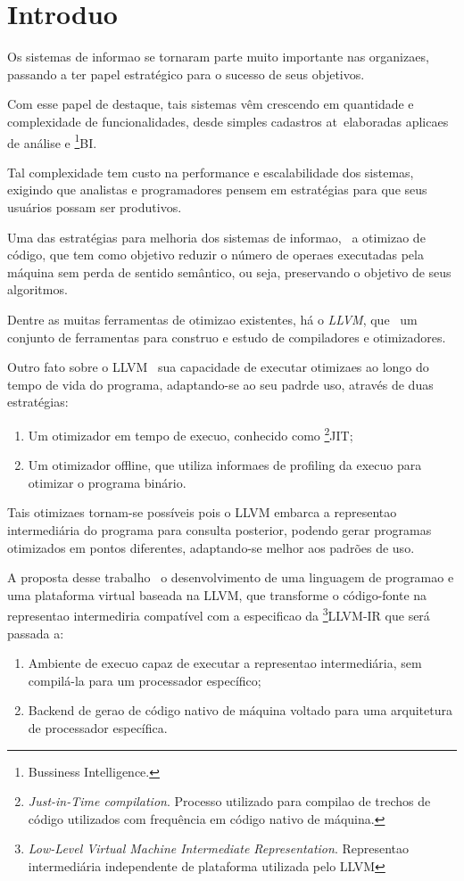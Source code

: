 
\chapter{Introdu\ca o}
\label{er:introducao}

Os sistemas de informa\ca o se tornaram parte muito importante nas organiza\co es, passando a ter papel estrat\'egico para o sucesso de seus objetivos.

Com esse papel de destaque, tais sistemas v\^em crescendo em quantidade e complexidade de funcionalidades, desde simples cadastros at\eh\ elaboradas aplica\co es de an\'alise e \footnote{Bussiness Intelligence.}{BI}.

Tal complexidade tem custo na performance e escalabilidade dos sistemas, exigindo que analistas e programadores pensem em estrat\'egias para que seus usu\'arios possam ser produtivos.

Uma das estrat\'egias para melhoria dos sistemas de informa\ca o, \eh\ a otimiza\ca o de c\'odigo, que tem como objetivo reduzir o n\'umero de opera\co es executadas pela m\'aquina sem perda de sentido sem\^antico, ou seja, preservando o objetivo de seus algoritmos.

Dentre as muitas ferramentas de otimiza\ca o existentes, h\'a o \textit{LLVM}, que \eh\ um conjunto de ferramentas para constru\ca o e estudo de compiladores e otimizadores.

Outro fato sobre o LLVM \eh\ sua capacidade de executar otimiza\co es ao longo do tempo de vida do programa, adaptando-se ao seu padr\ao de uso, atrav\'es de duas estrat\'egias:

\begin{enumerate}
\item Um otimizador em tempo de execu\ca o, conhecido como \footnote{\textit{Just-in-Time compilation}. Processo utilizado para compila\ca o de trechos de c\'odigo utilizados com frequ\^encia em c\'odigo nativo de m\'aquina.}{JIT};
\item Um otimizador offline, que utiliza informa\co es de profiling da execu\ca o para otimizar o programa bin\'ario.
\end{enumerate}

Tais otimiza\co es tornam-se poss\'iveis pois o LLVM embarca a representa\ca o intermedi\'aria do programa para consulta posterior, podendo gerar programas otimizados em pontos diferentes, adaptando-se melhor aos padr\~oes de uso.

A proposta desse trabalho \eh\ o desenvolvimento de uma linguagem de programa\ca o e uma plataforma virtual baseada na LLVM, que transforme o c\'odigo-fonte na representa\ca o intermedi\ah ria compat\'ivel com a especifica\ca o da \footnote{\textit{Low-Level Virtual Machine Intermediate Representation}. Representa\ca o intermedi\'aria independente de plataforma utilizada pelo LLVM}{LLVM-IR} que ser\'a passada a:

\begin{enumerate}
\item Ambiente de execu\ca o capaz de executar a representa\ca o intermedi\'aria, sem compil\'a-la para um processador espec\'ifico;
\item Backend de gera\ca o de c\'odigo nativo de m\'aquina voltado para uma arquitetura de processador espec\'ifica.
\end{enumerate}
